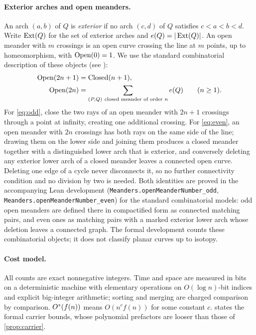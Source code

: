 \paragraph{Exterior arches and open meanders.}
An arch $(a,b)$ of $Q$ is \emph{exterior} if no arch $(c,d)$ of $Q$ satisfies
$c<a<b<d$. Write $\operatorname{Ext}(Q)$ for the set of exterior arches and $e(Q)=|\operatorname{Ext}(Q)|$.
An open meander with $m$ crossings is an open curve crossing the line at $m$
points, up to homeomorphism, with $\operatorname{Open}(0)=1$. We use the standard
combinatorial description of these objects (see \cite[\S2.1]{LaCroix2003}):
\begin{align}
 \operatorname{Open}(2n+1)&=\operatorname{Closed}(n+1), \label{eq:odd}\\
 \operatorname{Open}(2n)&=\sum_{(P,Q)\ \text{closed meander of order }n} e(Q)\qquad(n\ge1).
 \label{eq:even}
\end{align}
For \eqref{eq:odd}, close the two rays of an open meander with $2n+1$
crossings through a point at infinity, creating one additional crossing. For
\eqref{eq:even}, an open meander with $2n$ crossings has both rays on the same
side of the line; drawing them on the lower side and joining them produces a
closed meander together with a distinguished lower arch that is exterior, and
conversely deleting any exterior lower arch of a closed meander leaves a
connected open curve. Deleting one edge of a cycle never disconnects it, so no
further connectivity condition and no division by two is needed. Both
identities are proved in the accompanying Lean development
(\texttt{Meanders.openMeanderNumber\_odd}, \texttt{Meanders.openMeanderNumber\_even})
for the standard combinatorial models: odd open meanders are defined there
in compactified form as connected matching pairs, and even ones as matching
pairs with a marked exterior lower arch whose deletion leaves a connected
graph. The formal development counts these combinatorial objects; it does not
classify planar curves up to isotopy.

\paragraph{Cost model.}
All counts are exact nonnegative integers. Time and space are measured in bits
on a deterministic machine with elementary operations on $O(\log n)$-bit
indices and explicit big-integer arithmetic; sorting and merging are charged
comparison by comparison. $O^{*}(f(n))$ means $O(n^{c}f(n))$ for some constant
$c$.  states the formal carrier bounds, whose polynomial
prefactors are looser than those of \cref{prop:carrier}.
